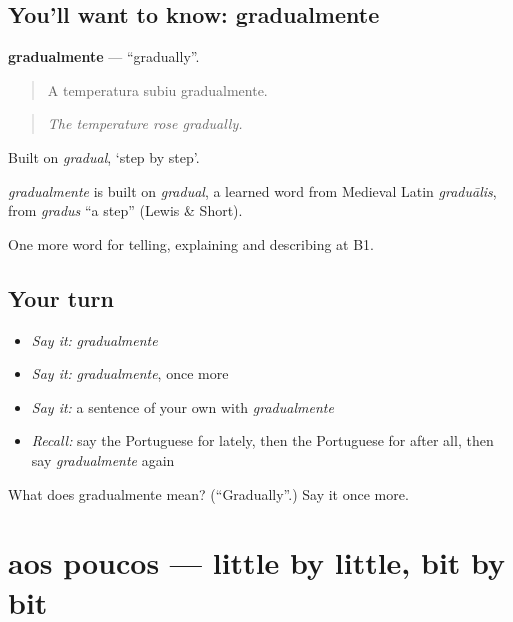 \subsection*{You'll want to know: gradualmente}
\textbf{gradualmente} — \textquotedblleft{}gradually\textquotedblright{}.

\begin{quote}
A temperatura subiu gradualmente.
\end{quote}

\begin{quote}
\emph{The temperature rose gradually.}
\end{quote}

Built on \emph{gradual}, ‘step by step’.

\begin{cousinweb}
\emph{gradualmente} is built on \emph{gradual}, a learned word from Medieval Latin \emph{graduālis}, from \emph{gradus} \textquotedblleft{}a step\textquotedblright{} (Lewis \& Short).
\end{cousinweb}

\begin{grammarlens}[title={What you've built}]
One more word for telling, explaining and describing at B1.
\end{grammarlens}

\subsection*{Your turn}
\begin{itemize}
\raggedright
  \item \emph{Say it:} \emph{gradualmente}
  \item \emph{Say it:} \emph{gradualmente}, once more
  \item \emph{Say it:} a sentence of your own with \emph{gradualmente}
  \item \emph{Recall:} say the Portuguese for lately, then the Portuguese for after all, then say \emph{gradualmente} again
\end{itemize}

\begin{tcolorbox}[breakable,colback=teal!4,colframe=teal!35!black,title={Before you move on}]
What does gradualmente mean? (\textquotedblleft{}Gradually\textquotedblright{}.) Say it once more.
\end{tcolorbox}
\section[aos poucos]{aos poucos — little by little, bit by bit}

